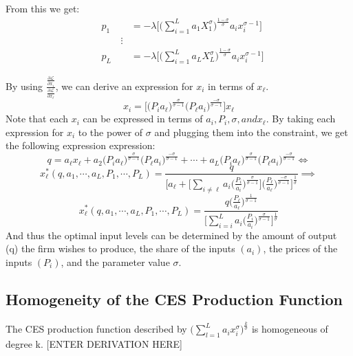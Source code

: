 From this we get:
\begin{equation*}
\begin{aligned}
& p_1 &= - \lambda \bigg[\Big(\sum_{i=1}^L a_1X_1^\sigma \Big)^\frac{1-\sigma}{\sigma}a_ix_i^{\sigma - 1} \bigg] \\
& \qquad \vdots \\
& p_L &= - \lambda \bigg[\Big(\sum_{i=1}^L a_LX_L^\sigma \Big)^\frac{1-\sigma}{\sigma}a_ix_i^{\sigma - 1} \bigg]
\end{aligned}
\end{equation*}

By using $\frac{\frac{\partial \mathcal{L}}{\partial x_i}}{\frac{\partial \mathcal{L}}{\partial x_{\ell}}}$, we can derive an expression for $x_i$ in terms of $x_{\ell}$.
\begin{equation*}
x_i = \bigg[\Big(P_ia_{\ell} \Big)^{\frac{\sigma}{\sigma - 1}} \Big(P_{\ell}a_i \Big)^{\frac{-\sigma}{\sigma - 1}} \bigg]x_{\ell}
\end{equation*}
Note that each $x_i$ can be expressed in terms of $a_i, P_i, \sigma, and x_{\ell}$.  By taking each expression for $x_i$ to the power of $\sigma$ and plugging them into the constraint, we get the following expression expression:
\begin{equation*}
q = a_{\ell}x_{\ell} + a_2\Big(P_ia_{\ell} \Big)^{\frac{\sigma}{\sigma - 1}} \Big(P_{\ell}a_i \Big)^{\frac{-\sigma}{\sigma - 1}} + \cdots + a_L\Big(P_ia_{\ell} \Big)^{\frac{\sigma}{\sigma - 1}} \Big(P_{\ell}a_i \Big)^{\frac{-\sigma}{\sigma - 1}} \iff
\end{equation*}
\begin{equation*}
x_{\ell}^{*}(q, a_1, \cdots, a_L, P_1, \cdots, P_L) = \frac{q}{\bigg[a_{\ell} + \Big[\sum_{i \neq \ell} a_i  \Big(\frac{P_i}{a_i} \Big)^{\frac{\sigma}{\sigma - 1}} \Big] \Big(\frac{P_{\ell}}{a_{\ell}} \Big)^{\frac{-\sigma}{\sigma - 1}} \bigg]^{\frac{1}{\sigma}}}  \implies
\end{equation*}
\begin{equation*}
x_{\ell}^{*} (q, a_1, \cdots, a_L, P_1, \cdots, P_L) = \frac{q \Big( \frac{P_{\ell}}{a_{\ell}} \Big)^{\frac{1}{\sigma - 1}}}{\bigg[\sum_{i=i}^L a_i \Big(\frac{P_i}{a_i}\Big)^\frac{\sigma}{\sigma-1} \bigg]^\frac{1}{\sigma}}
\end{equation*}
And thus the optimal input levels can be determined by the amount of output (q) the firm wishes to produce, the share of the inputs $(a_i)$, the prices of the inputs $(P_i)$, and the parameter value $\sigma$.

\subsection{Homogeneity of the CES Production Function}
The CES production function described by $\bigg( \sum_{l=1}^L a_ix_i^\sigma \bigg) ^{\frac{k}{\sigma}}$ is homogeneous of degree k. [ENTER DERIVATION HERE] \\

